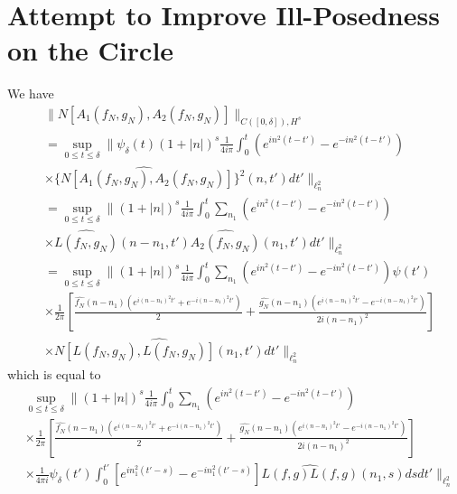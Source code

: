 \documentclass[12pt,reqno]{amsart}
\numberwithin{equation}{section}  %
\newcommand{\wh}{\widehat}
\begin{document}
\section{Attempt to Improve Ill-Posedness on the Circle} 
\label{sec:ill-pos-improv}
We have
%
%
\begin{equation*}
\begin{split}
  & \| N[A_{1}(f_{N}, g_{N}), A_{2}(f_{N}, {g_{N}})] \|_{C([0, \delta]),
  H^{s}}
  \\
  & = \sup_{0 \le t \le \delta} \| \psi_{\delta}(t) (1 + | n |)^{s}
  \frac{1}{4 i \pi} \int_{0}^{t} \left( e^{in^{2}(t-t')} - e^{-in^{2}(t-t')} \right)
  \\
  & \times \wh{\{N[A_{1}(f_{N}, g_{N}), A_{2}(f_{N}, g_{N})]} \}^{2}(n, t') dt'
  \|_{\ell^{2}_{n}}
  \\
  & = \sup_{0 \le t \le \delta} \| (1 + | n |)^{s} \frac{1}{4 i \pi} 
  \int_{0}^{t} \sum_{n_{1}} \left( e^{in^{2}(t-t')} - e^{-in^{2}(t-t')} \right)
  \\
  & \times \wh{L(f_{N},g_{N})}(n - n_{1}, t')\wh{A_{2}(f_{N},g_{N})}(n_{1}, t') dt'
  \|_{\ell^{2}_{n}}
  \\
  & = \sup_{0 \le t \le \delta} \| (1 + | n |)^{s} \frac{1}{4 i \pi} 
  \int_{0}^{t} \sum_{n_{1}} \left( e^{in^{2}(t-t')} - e^{-in^{2}(t-t')} \right)
  \psi(t')
  \\
  & \times \frac{1}{2 \pi} \left[ \frac{\wh{f_{N}}(n - n_{1})\left( e^{i(n - n_{1})^{2}t'} +
  e^{-i(n - n_{1})^{2}t'} \right)}{2} + \frac{\wh{g_{N}}(n - n_{1})\left(
  e^{i(n - n_{1})^{2}t'} - e^{-i(n - n_{1})^{2}t'}
  \right)}{2i(n - n_{1})^{2}} \right]
  \\
  & \times \wh{N[L(f_{N}, g_{N}), L(f_{N}, g_{N})](n_{1}, t')} dt' \|_{\ell^{2}_{n}}
\end{split}
\end{equation*}
which is equal to
\begin{equation*}
  \begin{split}
  & \sup_{0 \le t \le \delta} \| (1 + | n |)^{s} \frac{1}{4 i \pi} 
  \int_{0}^{t} \sum_{n_{1}} \left( e^{in^{2}(t-t')} - e^{-in^{2}(t-t')} \right)
  \\
  & \times \frac{1}{2 \pi} \left[ \frac{\wh{f_{N}}(n - n_{1})\left( e^{i(n - n_{1})^{2}t'} +
  e^{-i(n - n_{1})^{2}t'} \right)}{2} + \frac{\wh{g_{N}}(n - n_{1})\left(
  e^{i(n - n_{1})^{2}t'} - e^{-i(n - n_{1})^{2}t'}
  \right)}{2i(n - n_{1})^{2}} \right]
  \\
  & \times \frac{1}{4 \pi i} \psi_{\delta}(t') \int_{0}^{t'} \left[ e^{in_{1}^{2}(t' -s)} -
  e^{-in_{1}^{2}(t' -s)} \right] \wh{L(f, g) L(f,g)}(n_{1},s) ds dt'  \|_{\ell^{2}_{n}}
\end{split}
\end{equation*}
\end{document}
